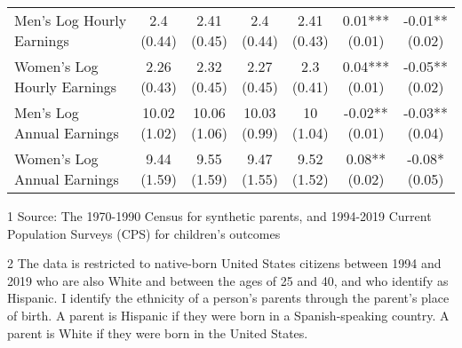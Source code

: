 \begin{table}[H]
{\begin{threeparttable}
\begin{tabular}[t]{lcccccc}
\addlinespace
\hspace{1em}Men’s Log Hourly Earnings & \specialcell{2.4\\(0.44)} & \specialcell{2.41\\(0.45)} & \specialcell{2.4\\(0.44)} & \specialcell{2.41\\(0.43)} & \specialcell{0.01***\\(0.01)} & \specialcell{-0.01**\\(0.02)}\\
\hspace{1em}Women’s Log Hourly Earnings & \specialcell{2.26\\(0.43)} & \specialcell{2.32\\(0.45)} & \specialcell{2.27\\(0.45)} & \specialcell{2.3\\(0.41)} & \specialcell{0.04***\\(0.01)} & \specialcell{-0.05**\\(0.02)}\\
\hspace{1em}Men’s Log Annual Earnings & \specialcell{10.02\\(1.02)} & \specialcell{10.06\\(1.06)} & \specialcell{10.03\\(0.99)} & \specialcell{10\\(1.04)} & \specialcell{-0.02**\\(0.01)} & \specialcell{-0.03**\\(0.04)}\\
\hspace{1em}Women’s Log Annual Earnings & \specialcell{9.44\\(1.59)} & \specialcell{9.55\\(1.59)} & \specialcell{9.47\\(1.55)} & \specialcell{9.52\\(1.52)} & \specialcell{0.08**\\(0.02)} & \specialcell{-0.08*\\(0.05)}\\
\bottomrule
\end{tabular}
\begin{tablenotes}
\item[1] Source: The 1970-1990 Census for synthetic parents, and 1994-2019 Current Population Surveys (CPS) for children's outcomes
\item[2] The data is restricted to native-born United States citizens between 1994 and 2019 who are also White and between the ages of 25 and 40, and who identify as Hispanic. I identify the ethnicity of a person's parents through the parent's place of birth. A parent is Hispanic if they were born in a Spanish-speaking country. A parent is White if they were born in the United States.
\end{tablenotes}
\end{threeparttable}}
\end{table}
